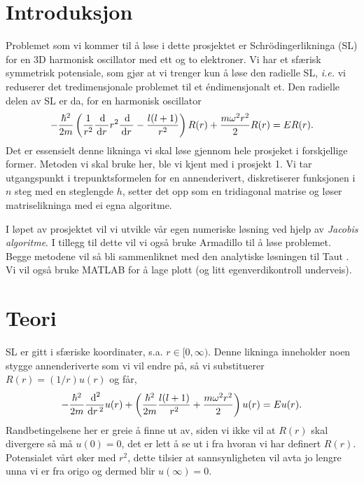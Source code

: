 \documentclass[norsk, 12pt]{article}
\theoremstyle{definition} \newtheorem{defi}{Definisjon}[subsection]
\theoremstyle{definition} \newtheorem{teo}{Teorem}[subsection]
\theoremstyle{definition} \newtheorem*{eks}{Eksempel}
\newcommand{\dr}{\, {\rm d}r\, }
\newcommand{\dd}{\, {\text d} }
\def\para#1{\left( #1 \right)}
\begin{document}
\section*{Introduksjon}
Problemet som vi kommer til å løse i dette prosjektet er Schrödingerlikninga (SL) for en 3D harmonisk oscillator med ett og to elektroner. Vi har et sfærisk symmetrisk potensiale, som gjør at vi trenger kun å løse den radielle SL, \emph{i.e.} vi reduserer det tredimensjonale problemet til et éndimensjonalt et. Den radielle delen av SL er da, for en harmonisk oscillator
$$ -\frac{\hbar^2}{2m} \para{ \frac{1}{r^2} \frac{\dd}{\dr}r^2 \frac{\dd}{\dr} - \frac{l(l+1)}{r^2}}R(r) + \frac{m\omega^2r^2}{2} R(r) = E R(r).$$
Det er essensielt denne likninga vi skal løse gjennom hele prosjeket i forskjellige former. Metoden vi skal bruke her, ble vi kjent med i prosjekt 1. Vi tar utgangspunkt i trepunktsformelen for en annenderivert, diskretiserer funksjonen i $n$ steg med en steglengde $h$, setter det opp som en tridiagonal matrise og løser matriselikninga med ei egna algoritme.

I løpet av prosjektet vil vi utvikle vår egen numeriske løsning ved hjelp av \emph{Jacobis algoritme}. I tillegg til dette vil vi også bruke Armadillo til å løse problemet. Begge metodene vil så bli sammenliknet med den analytiske løsningen til Taut \cite{Taut}. Vi vil også bruke MATLAB for å lage plott (og litt egenverdikontroll underveis). 

\section*{Teori}
SL er gitt i sfæriske koordinater, s.a. $r\in [0,\infty)$. Denne likninga inneholder noen stygge annenderiverte som vi vil endre på, så vi substituerer $R(r) = (1/r)u(r)$ og får,
$$ -\frac{\hbar^2}{2m}\frac{\dd^2}{\dr^2}u(r) + \para{\frac{\hbar^2}{2m}\frac{l(l+1)}{r^2} + \frac{m\omega^2r^2}{2}} u(r) = E u(r).$$
Randbetingelsene her er greie å finne ut av, siden vi ikke vil at  $R(r)$ skal divergere så må $u(0) = 0$, det er lett å se ut i fra hvoran vi har definert $R(r)$. Potensialet vårt øker med $r^2$, dette tilsier at sannsynligheten vil avta jo lengre unna vi er fra origo og dermed blir $u(\infty) = 0$. 
\end{document}
